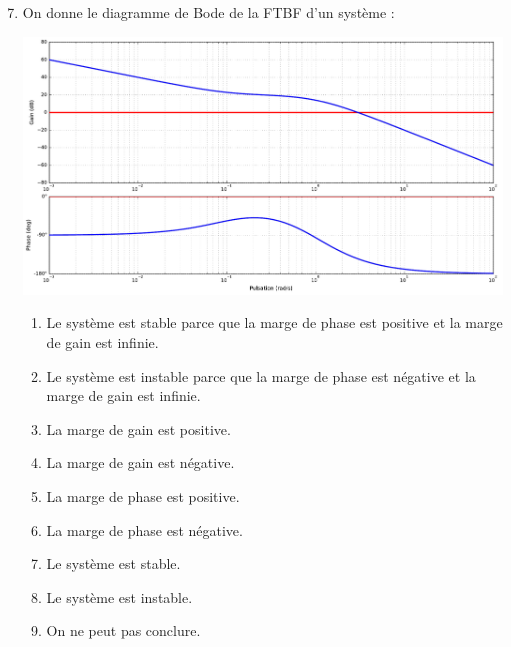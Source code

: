 \documentclass[10pt,fleqn]{article} %
\begin{document}
\begin{multicols}{2}
\begin{enumerate}
\setcounter{enumi}{6}
\item On donne le diagramme de Bode de la FTBF d'un système : 
\begin{center}
\includegraphics[width=\linewidth]{images/img_01}
\end{center}
\begin{enumerate}
\item Le système est stable parce que la marge de phase est positive et la marge de gain est infinie.
\item Le système est instable parce que la marge de phase est négative et la marge de gain est infinie.
\item La marge de gain est positive.
\item La marge de gain est négative.
\item La marge de phase est positive.
\item La marge de phase est négative.
\item Le système est stable.
\item Le système est instable.
\item On ne peut pas conclure. %
\end{enumerate}


\end{enumerate}
\end{multicols}
\end{document}
